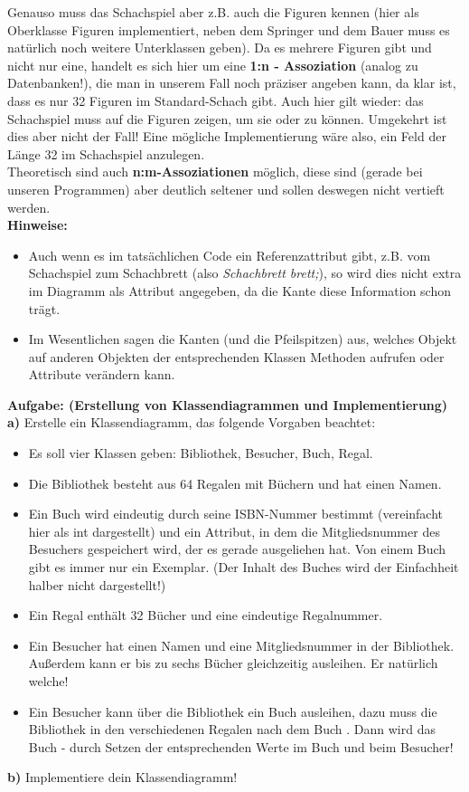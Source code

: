 \documentclass[fontsize=12pt]{article}
\begin{document}
Genauso muss das Schachspiel aber z.B. auch die Figuren kennen (hier als Oberklasse Figuren implementiert, neben dem Springer und dem Bauer muss es natürlich noch weitere Unterklassen geben). Da es mehrere Figuren gibt und nicht nur eine, handelt es sich hier um eine \textbf{1:n - Assoziation} (analog zu Datenbanken!), die man in unserem Fall noch präziser angeben kann, da klar ist, dass es nur 32 Figuren im Standard-Schach gibt. Auch hier gilt wieder: das Schachspiel muss auf die Figuren zeigen, um sie  oder  zu können. Umgekehrt ist dies aber nicht der Fall! Eine mögliche Implementierung wäre also, ein Feld der Länge 32 im Schachspiel anzulegen. \vspace{2mm} \\
Theoretisch sind auch \textbf{n:m-Assoziationen} möglich, diese sind (gerade bei unseren  Programmen) aber deutlich seltener  und sollen deswegen nicht vertieft werden. \\
\textbf{Hinweise:}
\begin{itemize}
    \item Auch wenn es im tatsächlichen Code ein Referenzattribut gibt, z.B. vom Schachspiel zum Schachbrett (also \textit{Schachbrett brett;}), so wird dies nicht extra im Diagramm als Attribut angegeben, da die Kante diese Information schon trägt.
    \item Im Wesentlichen sagen die Kanten (und die Pfeilspitzen) aus, welches Objekt auf anderen Objekten der entsprechenden Klassen Methoden aufrufen oder Attribute verändern kann. 
\end{itemize}
\newpage

\textbf{Aufgabe: (Erstellung von Klassendiagrammen und Implementierung)} \\
\textbf{a)} Erstelle ein Klassendiagramm, das folgende Vorgaben beachtet: 
\begin{itemize}
    \item Es soll vier Klassen geben: Bibliothek, Besucher, Buch, Regal.
    \item Die Bibliothek besteht aus 64 Regalen mit Büchern und hat einen Namen. 
    \item Ein Buch wird eindeutig durch seine ISBN-Nummer bestimmt (vereinfacht hier als int dargestellt) und ein Attribut, in dem die Mitgliedsnummer des Besuchers gespeichert wird, der es gerade ausgeliehen hat. Von einem Buch gibt es immer nur ein Exemplar. (Der Inhalt des Buches wird der Einfachheit halber nicht dargestellt!)
    \item Ein Regal enthält 32 Bücher und eine eindeutige Regalnummer. 
    \item Ein Besucher hat einen Namen und eine Mitgliedsnummer in der Bibliothek. Außerdem kann er bis zu sechs Bücher gleichzeitig ausleihen. Er  natürlich welche!
    \item Ein Besucher kann über die Bibliothek ein Buch ausleihen, dazu muss die Bibliothek in den verschiedenen Regalen nach dem Buch . Dann wird das Buch  - durch Setzen der entsprechenden Werte im Buch und beim Besucher!
\end{itemize} 
\textbf{b)} Implementiere dein Klassendiagramm!
\end{document}
